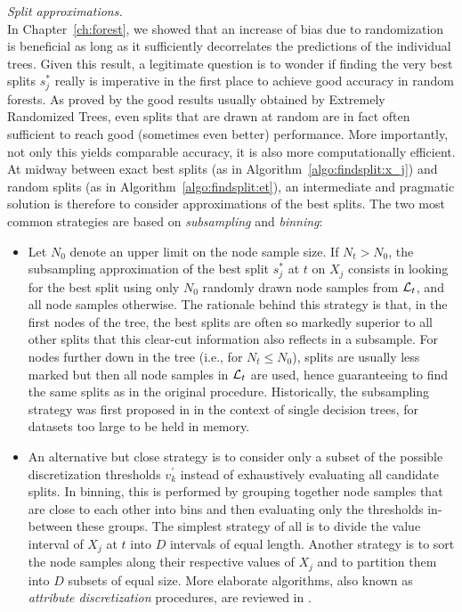 \begin{description}
\item \textit{Split approximations.}\hfill\\
    In Chapter~\ref{ch:forest}, we showed that an increase of bias due to
    randomization is beneficial as long as it sufficiently decorrelates the
    predictions of the individual trees. Given this result, a legitimate
    question is to wonder if finding the very best splits $s^*_j$ really is
    imperative in the first place to achieve good accuracy in random forests. As proved by the
    good results usually obtained by Extremely Randomized Trees, even splits
    that are drawn at random are in fact often sufficient to reach good
    (sometimes even better) performance. More importantly, not only this yields
    comparable accuracy, it is also more computationally efficient. At midway
    between  exact best splits (as in Algorithm~\ref{algo:findsplit:x_j}) and
    random splits (as in Algorithm~\ref{algo:findsplit:et}), an intermediate
    and pragmatic solution is therefore to consider approximations of the best splits.
    The two most common strategies are based on \textit{subsampling} and \textit{binning}:

    \begin{itemize}
    \item Let $N_0$ denote an upper limit on the node sample size. If $N_t > N_0$,
          the subsampling approximation of the best split $s^*_j$ at $t$ on $X_j$ consists
          in looking for the best split using only $N_0$ randomly drawn node
          samples from ${\cal L}_t$, and all node samples otherwise. The rationale behind this strategy is
          that, in the first nodes of the tree, the best splits are often
          so markedly superior to all other splits that this clear-cut information
          also reflects in a subsample. For nodes further down in the tree (i.e., for $N_t \leq N_0$),
          splits are usually less marked but then all node samples in ${\cal L}_t$
          are used, hence guaranteeing to find the same splits as in the original procedure.
          Historically, the subsampling strategy was first proposed in \citep{breiman:1984}
          in the context of single decision trees, for datasets too large to be held in memory.

    \item An alternative but close strategy is to consider only a subset
          of the possible discretization thresholds $v^\prime_k$ instead
          of exhaustively evaluating all candidate splits. In binning, this
          is performed by grouping together node samples that are close
          to each other into bins and then evaluating only the thresholds in-between these groups.
          The simplest strategy of all is to divide the value interval of $X_j$
          at $t$ into $D$ intervals of equal length. Another strategy
          is to sort the node samples along their respective values of $X_j$
          and to partition them into $D$ subsets of equal size.
          More elaborate algorithms, also known as \textit{attribute discretization} procedures,
          are reviewed in \citep{zighed:2000}.
    \end{itemize}


\end{description}
